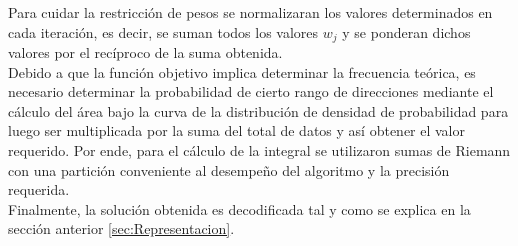 Para cuidar la restricción de pesos se normalizaran los valores determinados en cada iteración, es decir, se suman todos los valores $w_j$ y se ponderan dichos valores por el recíproco de la suma obtenida.\\
Debido a que la función objetivo implica determinar la frecuencia teórica, es necesario determinar la probabilidad
de cierto rango de direcciones mediante el cálculo del área bajo la curva de la distribución de densidad de probabilidad para luego ser multiplicada por la suma del total de datos y así obtener el valor requerido. Por ende, para el cálculo de la integral se utilizaron sumas de Riemann con una partición conveniente al desempeño del algoritmo y la precisión requerida.\\
Finalmente, la solución obtenida es decodificada tal y como se explica en la sección anterior \ref{sec:Representacion}.\\

